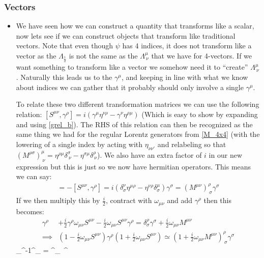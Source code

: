 \documentclass[11pt]{article}
\renewenvironment{flalign}{\vspace{-2mm}\empheq[box=\tcbhighmath]{align}}{\endempheq}
\numberwithin{equation}{section}
\begin{document}
\subsubsection{Vectors}
\begin{itemize}
  \item We have seen how we can construct a quantity that transforms like a scalar, now lets see if we can construct objects that transform like traditional vectors. Note that even though $\psi$ has 4 indices, it does not transform like a vector as the $\Lambda_{\frac{1}{2}}$ is not the same as the $\Lambda^{\mu}_{~\nu}$ that we have for 4-vectors. If we want something to transform like a vector we somehow need it to ``create'' $\Lambda^{\mu}_{~\nu}$. Naturally this leads us to the $\gamma^{\mu}$, and keeping in line with what we know about indices we can gather that it probably should only involve a single $\gamma^{\mu}$. 

  To relate these two different transformation matrices we can use the following relation: $[S^{\mu\nu},\gamma^{\rho}] = i(\gamma^{\mu}\eta^{\nu\rho}-\gamma^{\nu}\eta^{\rho\mu})$ (Which is easy to show by expanding and using \ref{grel_b}). The RHS of this relation can then be recognized as the same thing we had for the regular Lorentz generators from \ref{M_4x4} (with the lowering of a single index by acting with $\eta_{\nu\nu'}$ and relabeling so that $(M^{\rho\sigma})^{\mu}_{~\nu} = \eta^{\rho\mu}\delta^{\sigma}_{~\nu}-\eta^{\sigma\mu}\delta^{\rho}_{~\nu}$). We also have an extra factor of $i$ in our new expression but this is just so we now have hermitian operators.  This means we can say:
  \begin{align*}
     [\gamma^{\rho},S^{\mu\nu}]=-[S^{\mu\nu},\gamma^{\rho}] = i(\delta^{\nu}_{\sigma}\eta^{\mu\rho}-\eta^{\nu\rho}\delta^{\mu}_{\sigma})\gamma^{\sigma} = (M^{\mu\nu})^{\rho}_{~\sigma}\gamma^{\sigma}
   \end{align*}
   If we then multiply this by $\frac{i}{2}$, contract with $\omega_{\mu\nu}$ and add $\gamma^{\rho}$ then this becomes:
   \begin{align*}
     \gamma^{\rho}& +\frac{i}{2}\gamma^{\rho}\omega_{\mu\nu}S^{\mu\nu}-\frac{i}{2}\omega_{\mu\nu}S^{\mu\nu}\gamma^{\rho} = \delta^{\rho}_{\sigma}\gamma^{\sigma}+\frac{i}{2}\omega_{\mu\nu}M^{\mu\nu} \\
      \implies & (1-\frac{i}{2}\omega_{\mu\nu}S^{\mu\nu})\gamma^{\rho}(1+\frac{i}{2}\omega_{\mu\nu}S^{\mu\nu}) \simeq (1+\frac{i}{2}\omega_{\mu\nu}M^{\mu\nu})^{\rho}_{~\sigma}\gamma^{\sigma}
   \end{align*}
   \begin{flalign}
     \implies \Lambda_{}^{-1}\gamma^{\rho}\Lambda_{} = \Lambda^{\rho}_{~\sigma}\gamma^{\sigma}
   \end{flalign}


\end{itemize}
\end{document}
